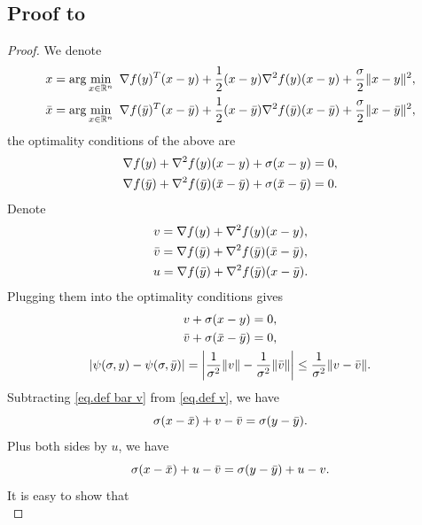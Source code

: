 \documentclass{mcom-l}
\numberwithin{equation}{section}
\begin{document}
\subsection*{Proof to }
\begin{proof}
    We denote
    \begin{gather*}
        x = \arg\min_{x\in \mathbb{R}^n} \ \nabla f(y)^T(x-y) +\frac{1}{2}(x-y)\nabla ^2 f(y)(x-y) +\frac{\sigma}{2}\|x-y\|^2,\\
        \Bar{x} = \arg\min_{x\in \mathbb{R}^n} \ \nabla f(\Bar{y})^T(x-\Bar{y}) +\frac{1}{2}(x-\Bar{y})\nabla ^2 f(\Bar{y})(x-\Bar{y}) +\frac{\sigma}{2}\|x-\Bar{y}\|^2,
    \end{gather*}
    the optimality conditions of the above are
    \begin{gather*}
        \nabla f(y) + \nabla ^2 f(y)(x-y) +\sigma(x-y)=0,\\
        \nabla f(\Bar{y})+\nabla ^2 f(\Bar{y})(\Bar{x}-\Bar{y})+\sigma(\Bar{x}-\Bar{y})=0.
    \end{gather*}
    Denote
    \begin{gather*}
        v = \nabla f(y) + \nabla ^2 f(y)(x-y),\\
        \Bar{v} =  \nabla f(\Bar{y})+\nabla ^2 f(\Bar{y})(\Bar{x}-\Bar{y}),\\
        u = \nabla f(\Bar{y})+\nabla ^2 f(\Bar{y})(x-\Bar{y}).
    \end{gather*}
    Plugging them into the optimality conditions gives
    \begin{gather}
        \label{eq.def v}
        v+\sigma(x-y)=0,\\
        \label{eq.def bar v}
        \Bar{v}+\sigma(\Bar{x}-\Bar{y})=0,\\
        \label{eq.target distance initial}
        \left \vert \psi(\sigma,y)-\psi(\sigma,\Bar{y}) \right\vert= \left \vert\frac{1}{\sigma^2}\|v\| -\frac{1}{\sigma^2}\|\Bar{v}\|\right\vert\leq \frac{1}{\sigma^2}\|v-\Bar{v}\|.
    \end{gather}
    Subtracting \eqref{eq.def bar v} from \eqref{eq.def v}, we have
    \begin{equation*}
        \sigma(x-\Bar{x})+v -\Bar{v} = \sigma(y-\Bar{y}).
    \end{equation*}
    Plus both sides by $u$, we have
    \begin{equation*}
        \sigma(x-\Bar{x})+u-\Bar{v} = \sigma(y-\Bar{y})+u-v.
    \end{equation*}
    It is easy to show that
    \begin{equation*}

\end{equation*}
\end{proof}
\end{document}
